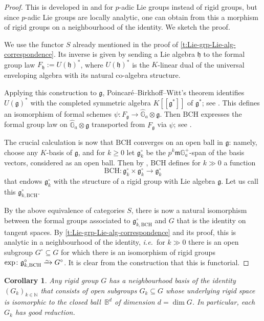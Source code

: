 \documentclass[10pt,a4paper]{article}
\newtheorem{Corollary}[thm]{Corollary}
\theoremstyle{definition}
\theoremstyle{remark}
\newcommand{\lra}{\longrightarrow}
\newcommand*{\lowsim}{\vbox to 0pt{\vss\hbox{$\scriptstyle\sim$}\vskip-2pt}}
\newcommand*{\isomarrow}{\xrightarrow{\lowsim}}
\newcommand{\B}{\mathbb{B}}
\newcommand{\G}{\mathbb{G}}
\newcommand{\N}{\mathbb{N}}
\newcommand{\m}{\mathfrak{m}}
\newcommand{\mg}{\mathfrak{g}}
\newcommand{\BCH}{\mathrm{BCH}}
\numberwithin{equation}{section}
\begin{document}
\begin{proof}
	This is developed in \cite[Chapitre~II]{Bourbaki-Lie} and \cite[Corollary~III.18.19]{Schneider_Lie} for $p$-adic Lie groups instead of rigid groups, but since $p$-adic Lie groups are locally analytic, one can obtain from this a morphism of rigid groups on a neighbourhood of the identity.	
	We sketch the proof.  
	
	We use the functor $S$ already mentioned in the proof of \cref{t:Lie-grp-Lie-alg-correspondence}.
	Its inverse is given by sending a Lie algebra $\mathfrak h$ to the formal group law $F_{\mathfrak h}:=U(\mathfrak h)^{\ast}$, where $U(\mathfrak h)^{\ast}$ is the $K$-linear dual of the universal enveloping algebra with its natural co-algebra structure.
	
	Applying this construction to $\mathfrak g$,  Poincar\'e--Birkhoff--Witt's theorem  identifies $U(\mathfrak g)^{\ast}$ with the completed symmetric algebra $K[[\mathfrak g^{\ast}]]$ of $\mg^\ast$; see \cite[Proposition~18.3]{Schneider_Lie}. This defines an isomorphism of formal schemes $\psi\colon F_{\mg}\to \widehat{\G}_a\otimes \mg$. Then $\mathrm{BCH}$ expresses the formal group law on $\widehat{\G}_a\otimes \mg$ transported from  $F_{\mg}$ via $\psi$; see \cite[Corollary~18.15]{Schneider_Lie}.
	
	The crucial calculation is now that $\mathrm{BCH}$ converges on an open ball in $\mg$: namely, choose any $K$-basis of $\mathfrak g$, and for $k\geq 0$ let $\mg^\circ_{k}$ be the $p^{k}\m\G_a^+$-span of the basis vectors, considered as an open ball. Then by \cite[Proposition~17.6]{Schneider_Lie}, $\mathrm{BCH}$ defines for $k\gg 0$ a function
	\[\mathrm{BCH}\colon\mg^\circ_{k}\times \mg^\circ_{k}\lra \mg^\circ_{k}\]
	that endows $\mg^\circ_{k}$ with the structure of a rigid group  with Lie algebra $\mathfrak g$. Let us call this $\mg^\circ_{k,\BCH}$.
	
	By the above equivalence of categories $S$, there is now a natural isomorphism between the formal groups associated to  $\mg^\circ_{k,\BCH}$ and $G$ that is the identity on tangent spaces. By \cref{t:Lie-grp-Lie-alg-correspondence} and its proof, this is analytic in a neighbourhood of the identity, \textit{i.e.}~for $k\gg 0$ there is an open subgroup $G^\circ\subseteq G$ for which there is an isomorphism of rigid groups $\exp\colon \mg^\circ_{k,\BCH}\isomarrow G^\circ$. It is clear from the construction that this is functorial.
\end{proof}

\begin{Corollary}\label{c:neighbourhood-basis-good-reduction}
	Any rigid group $G$ has a neighbourhood basis  of the identity  $(G_k)_{k\in\N}$ that consists of open subgroups $G_k\subseteq G$ whose underlying rigid space is isomorphic to the closed ball\, $\B^d$ of dimension $d=\dim G$. In particular, each $G_k$ has good reduction.
\end{Corollary}
\end{document}
